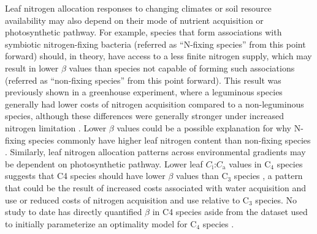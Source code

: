 Leaf nitrogen allocation responses to changing climates or soil resource availability may also depend on their mode of nutrient acquisition or photosynthetic pathway. For example, species that form associations with symbiotic nitrogen-fixing bacteria (referred as “N-fixing species” from this point forward) should, in theory, have access to a less finite nitrogen supply, which may result in lower $\beta$ values than species not capable of forming such associations (referred as “non-fixing species” from this point forward). This result was previously shown in a greenhouse experiment, where a leguminous species generally had lower costs of nitrogen acquisition compared to a non-leguminous species, although these differences were generally stronger under increased nitrogen limitation . Lower $\beta$ values could be a possible explanation for why N-fixing species commonly have higher leaf nitrogen content than non-fixing species . Similarly, leaf nitrogen allocation patterns across environmental gradients may be dependent on photosynthetic pathway. Lower leaf $C_\mathrm{i}$:$C_\mathrm{a}$ values in C$_4$ species suggests that C4 species should have lower $\beta$ values than C$_3$ species , a pattern that could be the result of increased costs associated with water acquisition and use or reduced costs of nitrogen acquisition and use relative to C$_3$ species. No study to date has directly quantified $\beta$ in C4 species aside from the dataset used to initially parameterize an optimality model for C$_4$ species .


